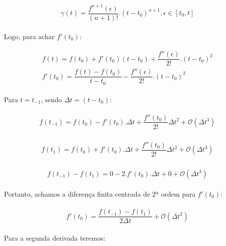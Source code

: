 \documentclass[12pt]{article}
\begin{document}
\begin{eqnarray}
\begin{split}
\gamma(t) = \dfrac{f^{n+1}(\epsilon)}{(n+1)!}.(t-t_{0})^{n+1}, \epsilon \in [t_{0}, t]
\end{split}
\label{eq:errorlagrange}
\end{eqnarray}

Logo, para achar $f'(t_{0})$:

\begin{eqnarray}
\begin{split}
f(t) = f(t_{0}) + f'(t_{0})(t - t_{0}) + \dfrac{f''(\epsilon)}{2!}.(t - t_{0})^{2} \\
f'(t_{0}) = \dfrac{f(t) - f(t_{0})}{t-t_{0}}  - \dfrac{f''(\epsilon)}{2!}.(t - t_{0})^{2}
\end{split}
\label{eq:flinhat0}
\end{eqnarray}

Para $t = t_{-1}$, sendo $\Delta t = (t - t_{0})$:

\begin{eqnarray}
\begin{split}
f(t_{-1}) =  f(t_{0}) - f'(t_{0}).\Delta t + \dfrac{f''(t_{0})}{2!} \Delta t^{2} + \mathcal{O}(\Delta t^{3})
\end{split}
\end{eqnarray}

\begin{eqnarray}
\begin{split}
f(t_{1}) =  f(t_{0}) + f'(t_{0}).\Delta t + \dfrac{f''(t_{0})}{2!} \Delta t^{2} + \mathcal{O}(\Delta t^{3})
\end{split}
\end{eqnarray}

\begin{eqnarray}
\begin{split}
f(t_{-1}) - f(t_{1}) =  0 - 2.f'(t_{0}).\Delta t + 0 + \mathcal{O}(\Delta t^{3})
\end{split}
\end{eqnarray}

Portanto, achamos a diferença finita centrada de $2ª$ ordem para $f'(t_{0})$: 

\begin{eqnarray}
\begin{split}
f'(t_{0}) = \dfrac{f(t_{-1}) - f(t_{1})}{2 \Delta t} + \mathcal{O}(\Delta t^{2})
\end{split}
\end{eqnarray}

Para a segunda derivada teremos:
\end{document}
